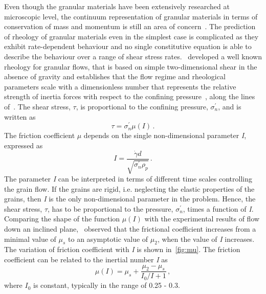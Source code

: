 Even though the granular materials have been extensively researched at 
microscopic level, the continuum representation of granular materials in terms 
of conservation of mass and momentum is still an area of 
concern~\citep{Midi2004,Daniel2007}. The prediction of rheology of granular 
materials even in the simplest case is complicated as they exhibit 
rate-dependent behaviour and no single constitutive equation is able to 
describe the behaviour over a range of shear stress rates.~\citet{DaCruz2005} 
developed a well known rheology for granular flows, that is based on 
simple two-dimensional shear in the absence of gravity and establishes that the 
flow regime and rheological parameters scale with a dimensionless number that 
represents the relative strength of inertia forces with respect to the 
confining pressure~\citep{Daniel2007}, along the lines of~\citet{Savage1991}. 
The shear stress, $\tau$, is proportional to the confining pressure, 
$\sigma_n^\prime$, and is written as
%
\begin{equation}
\tau = \sigma_n^\prime \mu (\mathit{I}) \,.
\end{equation}
%
The friction coefficient $\mu$ depends on the single non-dimensional parameter 
\textit{I}, expressed as
\begin{equation}
\textit{I} = \frac{\dot{\gamma}d}{\sqrt{ \sigma_n^\prime\rho_{\mathit{p}}}} \,.
\end{equation}
%
The parameter \textit{I} can be interpreted in terms of different time scales 
controlling the grain flow. If the grains are rigid, i.e. neglecting the 
elastic properties of the grains, then \textit{I} is the only 
non-dimensional parameter in the problem. Hence, the shear stress, $\tau$, has 
to be proportional to the pressure, $\sigma_n^\prime$, times a function of 
\textit{I}. Comparing the shape of the function $\mu(\mathit{I})$ with the 
experimental results of flow down an inclined plane,~\citet{Jop2006} observed 
that the frictional coefficient increases from a minimal value of 
$\mu_{\mathit{s}}$ to an asymptotic value of $\mu_{2}$, when the value of 
\textit{I} increases. The variation of friction coefficient with \textit{I} is 
shown in~\cref{fig:mu}. The friction coefficient can be related to the inertial 
number \textit{I} as
%
\begin{equation}
\mu(I) = \mu_s + \frac{\mu_2 - \mu_s}{I_0/I+1} \,,
\end{equation}
%
where $I_0$ is constant, typically in the range of 0.25 - 0.3. 


